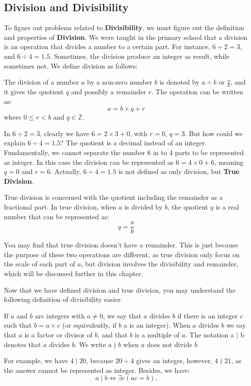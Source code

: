 \subsection{Division and Divisibility}
To figure out problems related to \textbf{Divisibility}, we must figure out the definition and properties
of \textbf{Division}. We were taught in the primary school that a division is an operation  that
divides a number to a certain part. For instance, $6\div2=3$, and $6\div4=1.5$. Sometimes, the
division produce an integer as result, while sometimes not. We define division as follows:
    \begin{definition}[Division]
        The division of a number \( a \) by a non-zero number \( b \) is denoted by \( a \div b \) or \( \frac{a}{b} \), and it gives the quotient \( q \) and possibly a remainder \( r \). The operation can be written as:
        \[
        a = b \times q + r
        \]
        where \( 0 \leq r < b \) and \(q \in \mathbb{Z}\).
    \end{definition}
    In $6\div2=3$, clearly we have $6=2\times3+0$, with $r=0$, $q=3$. But how could we explain
    $6\div4=1.5$? The quotient is a decimal instead of an integer. Fundamentally, we cannot separate
    the number 6 in to 4 parts to be represented as integer. In this case the division can be represented
    as $6 = 4\times0+6$, meaning $q=0$ and $r=6$. Actually, $6\div4=1.5$ is not defined as only
    division, but \textbf{True Division}.
    \begin{definition}
        True division is concerned with the quotient including the remainder as a fractional part. In true division, when \( a \) is divided by \( b \), the quotient \( q \) is a real number that can be represented as:
        \[
        q = \frac{a}{b}
        \]
    \end{definition}
    You may find that true division doesn't have a remainder. This is just because the purpose of 
    these two operations are different, as true division only focus on the scale of each part of
    $a$, but division involves the divisibility and remainder, which will be discussed further
    in this chapter.

    Now that we have defined division and true division, you may understand the following definition
    of divisibility easier.
    \begin{definition}[Divisibility]
        If $a$ and $b$ are integers with $a \neq 0$, we say that $a$ divides $b$ if there is an integer $c$ such that $b = a\times c$ (or equivalently, if $b$ a is an integer). When $a$ divides $b$ we say that $a$ is a factor or divisor of $b$, and that $b$ is a multiple of $a$. The notation a $\mid$ b denotes that $a$ divides $b$. We write $a \nmid b$ when $a$ does not divide $b$
    \end{definition}
    For example, we have $4\mid 20$, because $20\div4$ gives an integer, however, $4\nmid 21$, as the answer
    cannot be represented as integer. Besides, we have:
    \begin{equation}
        a\mid b \iff \exists c(ac=b).
    \end{equation}

